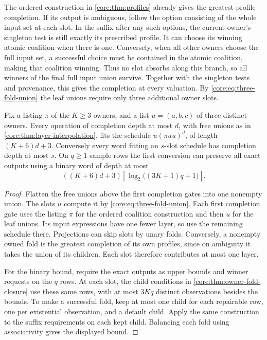 The ordered construction in \cref{core:thm:profiles} already gives the
greatest profile completion. If its output is ambiguous, follow the
option consisting of the whole input set at each slot. In the suffix
after any such options, the current owner's singleton test is still
exactly its prescribed profile. It can choose its winning atomic
coalition when there is one. Conversely, when all other owners choose
the full input set, a successful choice must be contained in the atomic
coalition, making that coalition winning. Thus no slot absorbs along
this branch, so all winners of the final full input union survive.
Together with the singleton tests and provenance, this gives the
completion at every valuation. By \eqref{core:eq:three-fold-union} the
leaf unions require only three additional owner slots.

\begin{theorem}
\label{core:thm:completion-fold-schedule}
Fix a listing $\pi$ of the $K\ge3$ owners, and a list $u=(a,b,c)$ of
three distinct owners. Every operation of completion depth at most $d$,
with free unions as in \cref{core:thm:layer-interpolation}, fits the
schedule $u(\pi u u)^d$, of length $(K+6)d+3$. Conversely every word
fitting an $s$-slot schedule has completion depth at most $s$.
On $q\ge1$ sample rows the first conversion can preserve all exact
outputs using a binary word of depth at most
\[
 ((K+6)d+3)\left\lceil\log_2\bigl((3K+1)q+1\bigr)\right\rceil .
\]
\end{theorem}
\begin{proof}
Flatten the free unions above the first completion gates into one
nonempty union. The slots $u$ compute it by
\eqref{core:eq:three-fold-union}. Each first completion gate uses
the listing $\pi$ for the ordered coalition construction and then
$u$ for the leaf unions. Its input expressions have one fewer layer,
so use the remaining schedule there. Projections can skip slots by
unary folds. Conversely, a nonempty owned fold is the greatest
completion of its own profiles, since on ambiguity it takes the union
of its children. Each slot therefore contributes at most one layer.

For the binary bound, require the exact outputs as upper bounds and
winner requests on the $q$ rows. At each slot, the child conditions in
\cref{core:thm:owner-fold-closure} use these same rows, with at most
$3Kq$ distinct observations besides the bounds. To make a successful
fold, keep at most one child for each repairable row, one per existential
observation, and a default child. Apply the same construction to the
suffix requirements on each kept child. Balancing each fold using
associativity gives the displayed bound.
\end{proof}

